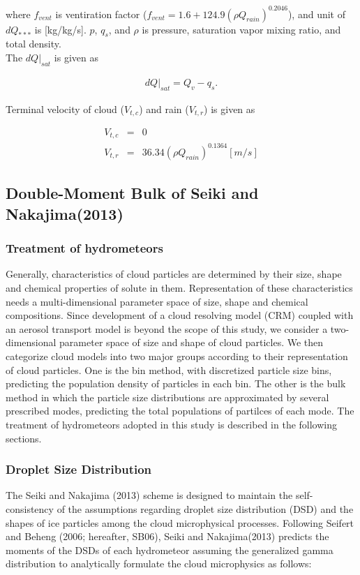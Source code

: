 where $f_{vent}$ is ventiration factor ($f_{vent}=1.6+124.9(\rho Q_{rain})^{0.2046}$), and unit of $dQ_{***}$ is [kg/kg/s]. $p$, $q_{s}$, and $\rho$ is pressure, saturation vapor mixing ratio, and total density.\\
The $dQ|_{sat}$ is given as

\begin{eqnarray}
dQ|_{sat}=Q_{v}-q_{s}.
\end{eqnarray}

Terminal velocity of cloud ($V_{t,c}$) and rain ($V_{t,r}$) is given as

\begin{eqnarray}
V_{t,c}&=&0\\
V_{t,r}&=&36.34(\rho Q_{rain})^{0.1364} [m/s]
\end{eqnarray}



\subsection{Double-Moment Bulk of Seiki and Nakajima(2013)}

\subsubsection{Treatment of hydrometeors}
Generally, characteristics of cloud particles are determined by their size, shape and chemical properties of solute in them. Representation of these characteristics needs a multi-dimensional parameter space of size, shape and chemical compositions. Since development of a cloud resolving model (CRM) coupled with an aerosol transport model is beyond the scope of this study, we consider a two-dimensional parameter space of size and shape of cloud particles. We then categorize cloud models into two major groups according to their representation of cloud particles. One is the bin method, with discretized particle size bins, predicting the population density of particles in each bin. The other is the bulk method in which the particle size distributions are approximated by several prescribed modes, predicting the total populations of partilces of each mode. The treatment of hydrometeors adopted in this study is described in the following sections.

\subsubsection{Droplet Size Distribution}
The Seiki and Nakajima (2013) scheme is designed to maintain the self-consistency of the assumptions regarding droplet size distribution (DSD) and the shapes of ice particles among the cloud microphysical processes. Following Seifert and Beheng (2006; hereafter, SB06), Seiki and Nakajima(2013) predicts the moments of the DSDs of each hydrometeor assuming the generalized gamma distribution to analytically formulate the cloud microphysics as follows:

